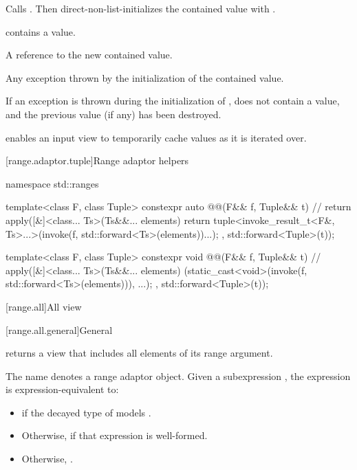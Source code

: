 \begin{itemize}
\begin{itemdescr}
 \effects
Calls .
Then direct-non-list-initializes the contained value with .

 \ensures
{} contains a value.

 \returns
A reference to the new contained value.

 \throws
Any exception thrown by the initialization of the contained value.

 \remarks
If an exception is thrown during the initialization of ,
 does not contain a value, and
the previous value (if any) has been destroyed.
\end{itemdescr}
\end{itemize}

\pnum
\begin{note}
 enables an input view
to temporarily cache values as it is iterated over.
\end{note}

[range.adaptor.tuple]{Range adaptor helpers}

\begin{codeblock}
namespace std::ranges {
  template<class F, class Tuple>
  constexpr auto @@(F&& f, Tuple&& t) { // \expos
    return apply([&]<class... Ts>(Ts&&... elements) {
      return tuple<invoke_result_t<F&, Ts>...>(invoke(f, std::forward<Ts>(elements))...);
    }, std::forward<Tuple>(t));
  }

  template<class F, class Tuple>
  constexpr void @@(F&& f, Tuple&& t) { // \expos
    apply([&]<class... Ts>(Ts&&... elements) {
      (static_cast<void>(invoke(f, std::forward<Ts>(elements))), ...);
    }, std::forward<Tuple>(t));
  }
}
\end{codeblock}

[range.all]{All view}

[range.all.general]{General}

\pnum
{}%
 returns a view that includes all elements of
its range argument.

\pnum
The name  denotes a
range adaptor object.
Given a subexpression , the expression
 is expression-equivalent to:
\begin{itemize}
\item {} if the decayed type of 
models .

\item Otherwise,  if that expression is well-formed.

\item Otherwise, .
\end{itemize}


